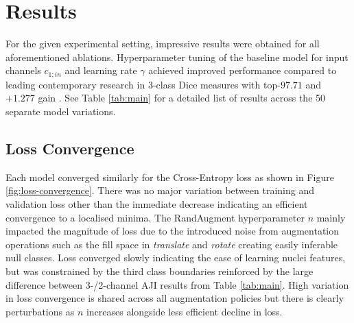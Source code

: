 \section{Results}

For the given experimental setting, impressive results were obtained for all aforementioned ablations. Hyperparameter tuning of the baseline model for input channels $c_{1;in}$ and learning rate $\gamma$ achieved improved performance compared to leading contemporary research in 3-class Dice measures with top-$97.71$ and $+1.277$ gain \cite{BBBC039ResearchStudy}. See Table \ref{tab:main} for a detailed list of results across the 50 separate model variations.


\subsection{Loss Convergence}

Each model converged similarly for the Cross-Entropy loss as shown in Figure \ref{fig:loss-convergence}. There was no major variation between training and validation loss other than the immediate decrease indicating an efficient convergence to a localised minima. The RandAugment hyperparameter $n$ mainly impacted the magnitude of loss due to the introduced noise from augmentation operations such as the fill space in \textit{translate} and \textit{rotate} creating easily inferable null classes. Loss converged slowly indicating the ease of learning nuclei features, but was constrained by the third class boundaries reinforced by the large difference between 3-/2-channel AJI results from Table \ref{tab:main}. High variation in loss convergence is shared across all augmentation policies but there is clearly perturbations as $n$ increases alongside less efficient decline in loss.

